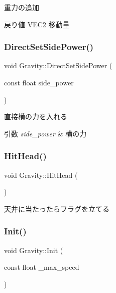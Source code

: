 重力の追加 

\begin{DoxyReturn}{戻り値}
V\+E\+C2 移動量 
\end{DoxyReturn}
\mbox{\label{class_gravity_a015bda4dc0019baaa70378e1d6715a55}} 
\subsubsection{\texorpdfstring{Direct\+Set\+Side\+Power()}{DirectSetSidePower()}}
{\footnotesize\ttfamily void Gravity\+::\+Direct\+Set\+Side\+Power (\begin{DoxyParamCaption}\item[{const float}]{side\+\_\+power }\end{DoxyParamCaption})\hspace{0.3cm}{\ttfamily [inline]}}



直接横の力を入れる 


\begin{DoxyParams}{引数}
{\em side\+\_\+power} & 横の力 \\
\hline
\end{DoxyParams}
\mbox{\label{class_gravity_a56fa68b18b0426bdb267850e1917eb05}} 
\subsubsection{\texorpdfstring{Hit\+Head()}{HitHead()}}
{\footnotesize\ttfamily void Gravity\+::\+Hit\+Head (\begin{DoxyParamCaption}{ }\end{DoxyParamCaption})\hspace{0.3cm}{\ttfamily [inline]}}



天井に当たったらフラグを立てる 

\mbox{\label{class_gravity_acd4190d806a404342bbb49031e47b7b6}} 
\subsubsection{\texorpdfstring{Init()}{Init()}}
{\footnotesize\ttfamily void Gravity\+::\+Init (\begin{DoxyParamCaption}\item[{const float}]{\+\_\+max\+\_\+speed }\end{DoxyParamCaption})\hspace{0.3cm}{\ttfamily [inline]}}



